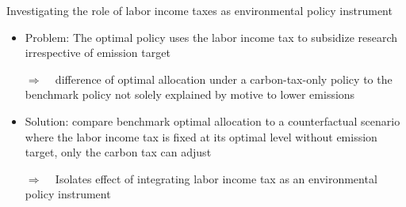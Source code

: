 \documentclass[11pt,aspectratio=169]{beamer}
\newcommand{\ar}{$\Rightarrow$ \ }
\begin{document}
	\begin{frame}{Investigating the role of labor income taxes as environmental policy instrument}
		
		
		\begin{itemize}[<+-| alert@+>]
			\item 	{Problem: The optimal policy uses the labor income tax to subsidize research irrespective of emission target}
			\vspace{3mm}
			\item[\ar] difference of optimal allocation under a carbon-tax-only policy to the benchmark policy not solely explained by motive to lower emissions %
			\vspace{3mm}
			\item Solution: compare benchmark optimal allocation to a counterfactual scenario where the labor income tax is fixed at its optimal level without emission target, only the carbon tax can adjust
			\vspace{3mm}
			\item[\ar] Isolates effect of integrating labor income tax as an environmental policy instrument 
		\end{itemize}
	\end{frame}
	
\end{document}
